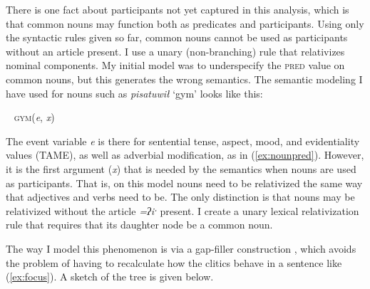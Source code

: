 There is one fact about participants not yet captured in this analysis, which is that common nouns may function both as predicates and participants. Using only the syntactic rules given so far, common nouns cannot be used as participants without an article present. I use a unary (non-branching) rule that relativizes nominal components. My initial model was to underspecify the \textsc{pred} value on common nouns, but this generates the wrong semantics. The semantic modeling I have used for nouns such as \textit{pisatuwił} `gym' looks like this:

\ex~
\textsc{gym}(\textit{e}, \textit{x})
\xe

The event variable \textit{e} is there for sentential tense, aspect, mood, and evidentiality values (TAME), as well as adverbial modification, as in (\ref{ex:nounpred}). However, it is the first argument (\textit{x}) that is needed by the semantics when nouns are used as participants. That is, on this model nouns need to be relativized the same way that adjectives and verbs need to be. The only distinction is that nouns may be relativized without the article \textit{=ʔiˑ} present. I create a unary lexical relativization rule that requires that its daughter node be a common noun.



The way I model this phenomenon is via a gap-filler construction \citep[Chapter 4]{pollardsag1994}, which avoids the problem of having to recalculate how the clitics behave in a sentence like (\ref{ex:focus}). A sketch of the tree is given below.

